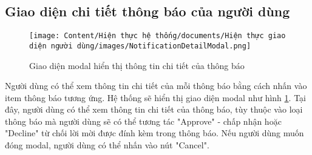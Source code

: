 \subsection{Giao diện chi tiết thông báo của người dùng}

\begin{figure}[H]
    \centering
    \texttt{[image: Content/Hiện thực hệ thống/documents/Hiện thực giao diện người dùng/images/NotificationDetailModal.png]}
    \vspace{0.5cm}
    \caption{Giao diện modal hiển thị thông tin chi tiết của thông báo}
    \label{fig: Giao diện modal hiển thị thông tin chi tiết của thông báo}
\end{figure}

Người dùng có thể xem thông tin chi tiết của mỗi thông báo bằng cách nhấn vào item thông báo tương ứng. Hệ thống sẽ hiển thị giao diện modal như hình \ref{fig: Giao diện modal hiển thị thông tin chi tiết của thông báo}. Tại đây, người dùng có thể xem thông tin chi tiết của thông báo, tùy thuộc vào loại thông báo mà người dùng sẽ có thể tương tác "Approve" - chấp nhận hoặc "Decline" từ chối lời mời được đính kèm trong thông báo. Nếu người dùng muốn đóng modal, người dùng có thể nhấn vào nút "Cancel".
